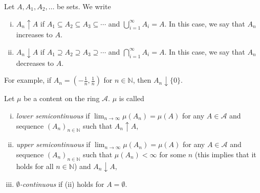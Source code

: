 \begin{definition}
    Let $A,A_1,A_2,\ldots$ be sets. We write
    \begin{enumerate}[(i)]
        \item $A_n\uparrow A$ if $A_1\subseteq A_2\subseteq A_3\subseteq\cdots$ and $\bigcup_{i=1}^\infty A_i=A$. In this case, we say that $A_n$ increases to $A$.
        \item $A_n\downarrow A$ if $A_1\supseteq A_2\supseteq A_3\supseteq\cdots$ and $\bigcap_{i=1}^\infty A_i=A$. In this case, we say that $A_n$ decreases to $A$.
    \end{enumerate}
\end{definition}

For example, if $A_n=\left(-\frac{1}{n},\frac{1}{n}\right)$ for $n\in\mathbb{N}$, then $A_n\downarrow \{0\}$.

\begin{definition}
    Let $\mu$ be a content on the ring $\mathcal{A}$. $\mu$ is called
    \begin{enumerate}[(i)]
        \item \textit{lower semicontinuous} if $\lim_{n\to\infty}\mu(A_n)=\mu(A)$ for any $A\in\mathcal{A}$ and sequence $(A_n)_{n\in\mathbb{N}}$ such that $A_n\uparrow A$,
        \item \textit{upper semicontinuous} if $\lim_{n\to\infty}\mu(A_n)=\mu(A)$ for any $A\in\mathcal{A}$ and sequence $(A_n)_{n\in\mathbb{N}}$ such that $\mu(A_n)<\infty$ for some $n$ (this implies that it holds for all $n\in\mathbb{N}$) and $A_n\downarrow A$,
        \item \textit{$\emptyset$-continuous} if (ii) holds for $A=\emptyset$.
    \end{enumerate}
\end{definition}

